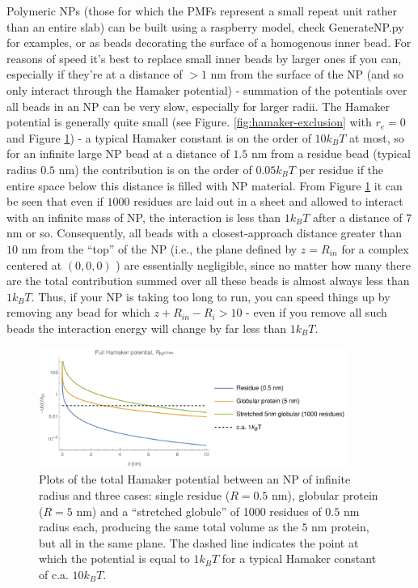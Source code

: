 \documentclass[10pt,a4paper,onecolumn]{report}
\begin{document}
Polymeric NPs (those for which the PMFs represent a small repeat unit rather than an entire slab) can be built using a raspberry model, check GenerateNP.py for examples, or as beads decorating the surface of a homogenous inner bead. For reasons of speed it's best to replace small inner beads by larger ones if you can, especially if they're at a distance of $> 1$ nm from the surface of the NP (and so only interact through the Hamaker potential) - summation of the potentials over all beads in an NP can be very slow, especially for larger radii. The Hamaker potential is generally quite small (see Figure. \ref{fig:hamaker-exclusion} with $r_e = 0$ and Figure \ref{fig:hamaker-longrange}) - a typical Hamaker constant is on the order of $10 k_BT$ at most, so for an infinite large NP bead at a distance of $1.5$ nm from a residue bead (typical radius $0.5$ nm) the contribution is on the order of $0.05  k_BT$ per residue if the entire space below this distance is filled with NP material. From Figure \ref{fig:hamaker-longrange} it can be seen that even if $1000$ residues are laid out in a sheet and allowed to interact with an infinite mass of NP, the interaction is less than $1 k_B T$ after a distance of $7$ nm or so. Consequently, all beads with a closest-approach distance greater than $10$ nm from the ``top'' of the NP (i.e., the plane defined by $z = R_{in}$ for a complex centered at $(0,0,0)$ ) are essentially negligible, since no matter how many there are the total contribution summed over all these beads is almost always less than $1 k_B T$. Thus, if your NP is taking too long to run, you can speed things up by removing any bead for which $z +   R_{in} - R_i > 10$ - even if you remove all such beads the interaction energy will change by far less than $1 k_B T$. 



 
\begin{figure} \label{fig:hamaker-longrange}
    \centering
    \includegraphics[width=0.9\textwidth]{figures/hamaker_longrange.pdf}
    \caption{Plots of the total Hamaker potential between an NP of infinite radius and three cases: single residue ($R = 0.5$ nm), globular protein ($R=5$ nm) and a ``stretched globule'' of 1000 residues of $0.5$ nm radius each, producing the same total volume as the $5$ nm protein, but all in the same plane. The dashed line indicates the point at which the potential is equal to $1 k_B T$ for a typical Hamaker constant of c.a. $10 k_B T$. }
\end{figure}
\end{document}
